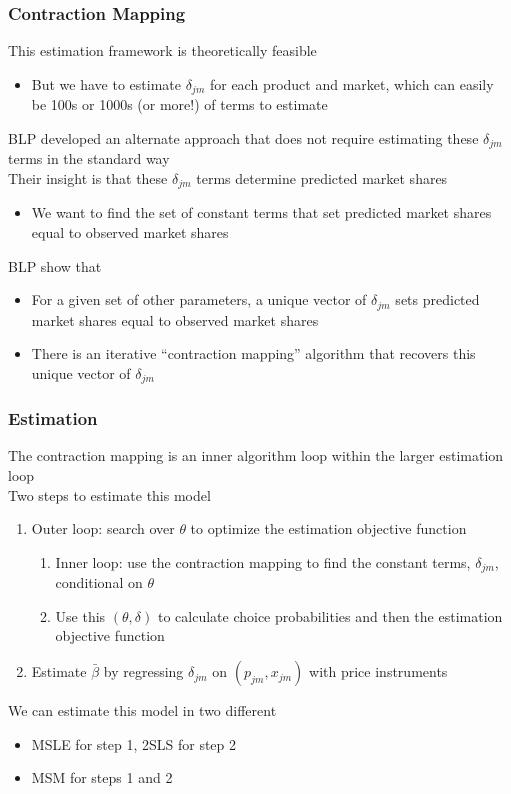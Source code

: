 \documentclass{beamer}
\begin{document}
\begin{frame}\frametitle{Contraction Mapping}
    This estimation framework is theoretically feasible
    \begin{itemize}
        \item But we have to estimate $\delta_{jm}$ for each product and market, which can easily be 100s or 1000s (or more!) of terms to estimate
    \end{itemize}
    \vspace{2ex}
    BLP developed an alternate approach that does not require estimating these $\delta_{jm}$ terms in the standard way \\
    \vspace{2ex}
    Their insight is that these $\delta_{jm}$ terms determine predicted market shares
    \begin{itemize}
        \item We want to find the set of constant terms that set predicted market shares equal to observed market shares
    \end{itemize}
    \vspace{2ex}
    BLP show that
    \begin{itemize}
        \item For a given set of other parameters, a unique vector of $\delta_{jm}$ sets predicted market shares equal to observed market shares
        \item There is an iterative ``contraction mapping'' algorithm that recovers this unique vector of $\delta_{jm}$
    \end{itemize}
\end{frame}

\begin{frame}\frametitle{Estimation}
    The contraction mapping is an inner algorithm loop within the larger estimation loop \\
    \vspace{2ex}
    Two steps to estimate this model
    \begin{enumerate}
        \item Outer loop: search over $\theta$ to optimize the estimation objective function
        \begin{enumerate}
            \item Inner loop: use the contraction mapping to find the constant terms, $\delta_{jm}$, conditional on $\theta$
            \item Use this $(\theta, \delta)$ to calculate choice probabilities and then the estimation objective function
        \end{enumerate}
        \item Estimate $\bar{\beta}$ by regressing $\delta_{jm}$ on $(p_{jm}, x_{jm})$ with price instruments
    \end{enumerate}
    \vspace{2ex}
    We can estimate this model in two different
    \begin{itemize}
        \item MSLE for step 1, 2SLS for step 2
        \item MSM for steps 1 and 2
    \end{itemize}
\end{frame}
\end{document}
